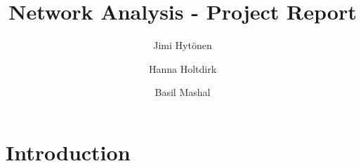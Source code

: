 \documentclass[11pt]{article}
\title{Network Analysis - Project Report}
\author{
    Jimi Hytönen\\
    \and Hanna Holtdirk\\
    \and Basil Mashal
}
\begin{document}
\maketitle

\section{Introduction}
\end{document}
